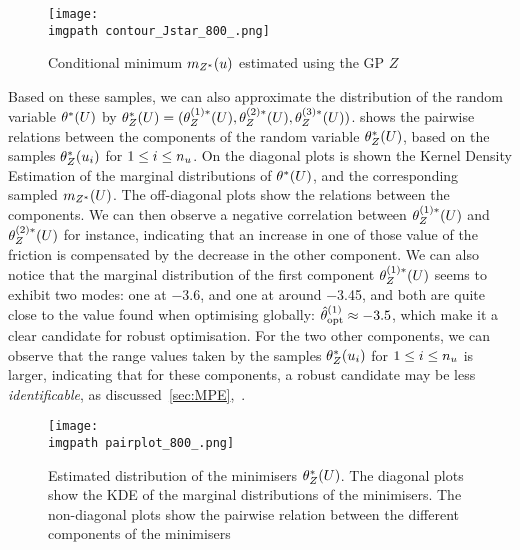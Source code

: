\documentclass[../../Main_ManuscritThese.tex]{subfiles}
\newcommand\imgpath{/home/victor/acadwriting/Manuscrit/Text/Chapter5/img/}
\begin{document}
\begin{figure}[ht]
 \centering
 \texttt{[image: \\imgpath contour\_Jstar\_800\_.png]}
 \caption{\label{fig:contour_Jstar} Conditional minimum $m_{Z^*}(u)$
   estimated using the GP $Z$}
\end{figure}
Based on these samples, we can also approximate the distribution of
the random variable $\kk^*(\UU)$ by
$\theta_Z^*(U) = (\theta^{(1) *}_Z(U), \theta^{(2) *}_Z(U), \theta^{(3)
  *}_Z(U))$.   shows the pairwise relations
between the components of the random variable $\theta^*_Z(U)$, based on
the samples $\theta^*_Z(u_i)$ for $1\leq i \leq n_{u}$. On the
diagonal plots is shown the Kernel Density Estimation of the marginal
distributions of $\kk^*(\UU)$, and the corresponding sampled
$m_{Z^*}(U)$. The off-diagonal plots show the relations between the
components. We can then observe a negative correlation between
$\theta^{(1) *}_Z(U)$ and $\theta^{(2) *}_Z(U)$ for instance, indicating that
an increase in one of those value of the friction is compensated by
the decrease in the other component.  We can also notice that the
marginal distribution of the first component $\theta_Z^{(1)*}(U)$ seems
to exhibit two modes: one at \num{-3.6}, and one at around
\num{-3.45}, and both are quite close to the value found when
optimising globally:
$\hat{\theta}^{(1)}_{\mathrm{opt}}\approx \num{-3.5}$, which make it a
clear candidate for robust optimisation. For the two other components,
we can observe that the range values taken by the samples
$\theta^*_Z(u_i)$ for $1 \leq i \leq n_{u}$ is larger, indicating
that for these components, a robust candidate may be less
\emph{identificable}, as discussed~\cref{sec:MPE},~.

\begin{figure}[ht]
  \centering
  \texttt{[image: \\imgpath pairplot\_800\_.png]}
  \caption[Distribution of the minimisers
  $\kk^*(\UU)$]{\label{fig:pairplot} Estimated distribution of the
    minimisers $\theta^*_Z(U)$. The diagonal plots show the KDE of the
    marginal distributions of the minimisers. The non-diagonal plots
    show the pairwise relation between the different components of the
    minimisers }
\end{figure}

\clearpage
\end{document}
